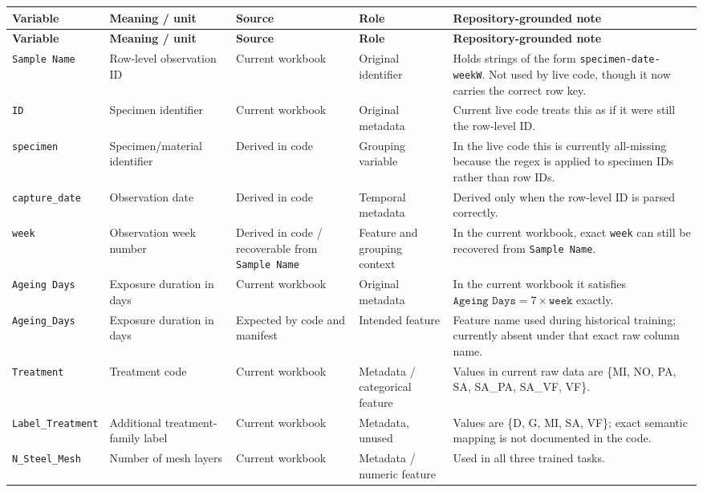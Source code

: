 \documentclass[11pt]{article}
\begin{document}
\begin{longtable}{p{} p{} p{} p{} p{}}
\toprule
\textbf{Variable} & \textbf{Meaning / unit} & \textbf{Source} & \textbf{Role} & \textbf{Repository-grounded note} \\
\midrule
\endfirsthead
\toprule
\textbf{Variable} & \textbf{Meaning / unit} & \textbf{Source} & \textbf{Role} & \textbf{Repository-grounded note} \\
\midrule
\endhead
\texttt{Sample Name} & Row-level observation ID & Current workbook & Original identifier & Holds strings of the form \texttt{specimen-date-weekW}. Not used by live code, though it now carries the correct row key. \\
\texttt{ID} & Specimen identifier & Current workbook & Original metadata & Current live code treats this as if it were still the row-level ID. \\
\texttt{specimen} & Specimen/material identifier & Derived in code & Grouping variable & In the live code this is currently all-missing because the regex is applied to specimen IDs rather than row IDs. \\
\texttt{capture\_date} & Observation date & Derived in code & Temporal metadata & Derived only when the row-level ID is parsed correctly. \\
\texttt{week} & Observation week number & Derived in code / recoverable from \texttt{Sample Name} & Feature and grouping context & In the current workbook, exact \texttt{week} can still be recovered from \texttt{Sample Name}. \\
\texttt{Ageing Days} & Exposure duration in days & Current workbook & Original metadata & In the current workbook it satisfies \(\texttt{Ageing Days} = 7 \times \texttt{week}\) exactly. \\
\texttt{Ageing\_Days} & Exposure duration in days & Expected by code and manifest & Intended feature & Feature name used during historical training; currently absent under that exact raw column name. \\
\texttt{Treatment} & Treatment code & Current workbook & Metadata / categorical feature & Values in current raw data are \{MI, NO, PA, SA, SA\_PA, SA\_VF, VF\}. \\
\texttt{Label\_Treatment} & Additional treatment-family label & Current workbook & Metadata, unused & Values are \{D, G, MI, SA, VF\}; exact semantic mapping is not documented in the code. \\
\texttt{N\_Steel\_Mesh} & Number of mesh layers & Current workbook & Metadata / numeric feature & Used in all three trained tasks. \\

\end{longtable}
\end{document}
